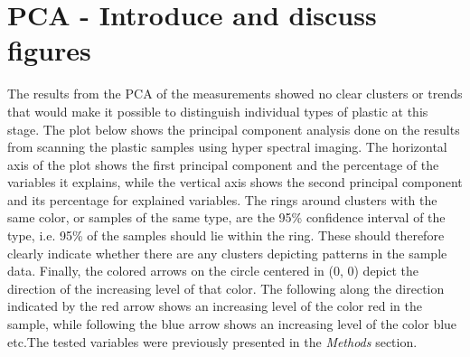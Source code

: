 \section{PCA - Introduce and discuss figures}
The results from the PCA of the measurements showed no clear clusters or trends that would make it possible to distinguish individual types of plastic at this stage. The plot below shows the principal component analysis done on the results from scanning the plastic samples using hyper spectral imaging. The horizontal axis of the plot shows the first principal component and the percentage of the variables it explains, while the vertical axis shows the second principal component and its percentage for explained variables. The rings around clusters with the same color, or samples of the same type, are the 95\% confidence interval of the type, i.e. 95\% of the samples should lie within the ring. These should therefore clearly indicate whether there are any clusters depicting patterns in the sample data. Finally, the colored arrows on the circle centered in (0, 0) depict the direction of the increasing level of that color. The following along the direction indicated by the red arrow shows an increasing level of the color red in the sample, while following the blue arrow shows an increasing level of the color blue etc.The tested variables were previously presented in the \textit{Methods} section.

